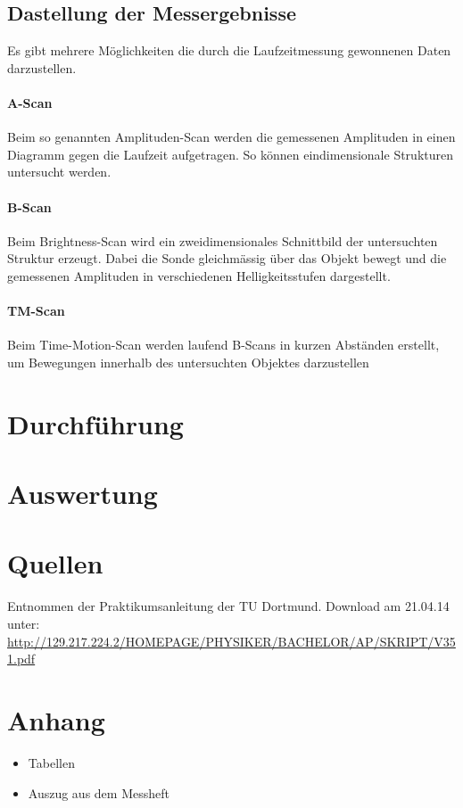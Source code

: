 \documentclass[11pt,ngerman,a4paper]{article}
\begin{document}
\subsection{Dastellung der Messergebnisse}
Es gibt mehrere M\"oglichkeiten die durch die Laufzeitmessung gewonnenen Daten darzustellen.
\paragraph{A-Scan} Beim so genannten Amplituden-Scan werden die gemessenen Amplituden in einen Diagramm gegen die Laufzeit aufgetragen. So k\"onnen eindimensionale Strukturen untersucht werden. 
\paragraph{B-Scan}
Beim Brightness-Scan wird ein zweidimensionales Schnittbild der untersuchten Struktur erzeugt. Dabei die Sonde gleichm\"assig \"uber das Objekt bewegt und die gemessenen Amplituden in verschiedenen Helligkeitsstufen dargestellt.  
\paragraph{TM-Scan} Beim Time-Motion-Scan werden laufend B-Scans in kurzen Abst\"anden erstellt, um Bewegungen innerhalb des untersuchten Objektes darzustellen

\section{Durchf\"uhrung }
\section{Auswertung}

\section{Quellen}
\begin{enumerate}[{[}1{]}]
\item Entnommen der Praktikumsanleitung \textit{} der TU Dortmund. Download am 21.04.14 unter:\\
 \url{http://129.217.224.2/HOMEPAGE/PHYSIKER/BACHELOR/AP/SKRIPT/V351.pdf}
\end{enumerate}

\section{Anhang}
\begin{itemize}
\item Tabellen
\item Auszug aus dem Messheft
\end{itemize}
\end{document}
